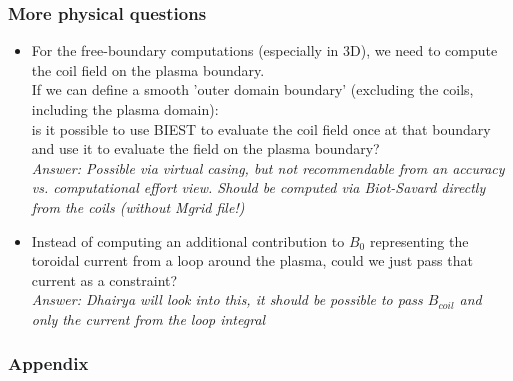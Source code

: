 \documentclass[aspectratio=169]{beamer}
\begin{document}
\begin{frame}
 \frametitle{More physical questions}
 \begin{itemize}
  \item For the free-boundary computations (especially in 3D), we need to compute the coil field on the plasma boundary. \\ If we can define a smooth 'outer domain boundary' (excluding the coils, including the plasma domain): \\
  is it possible to use BIEST to evaluate the coil field once at that boundary and use it to evaluate the field on the plasma boundary?\\
    \textit{\scriptsize Answer: Possible via virtual casing, but not recommendable from an accuracy vs. computational effort view. Should be computed via Biot-Savard directly from the coils (without Mgrid file!) }
  \item Instead of computing an additional  contribution to $B_0$ representing the toroidal current from a loop around the plasma, could we just pass that current as a constraint? \\
    \textit{\scriptsize Answer: Dhairya will look into this, it should be possible to pass $B_{coil}$ and only the current from the loop integral}
\end{itemize}
\end{frame}


\begin{frame}
\frametitle{Appendix}
\end{frame}
\end{document}
